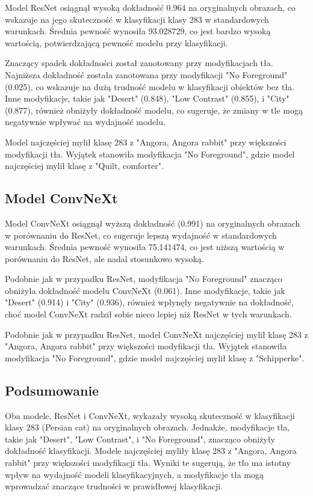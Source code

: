 Model ResNet osiągnął wysoką dokładność 0.964 na oryginalnych obrazach, co wskazuje na jego skuteczność w klasyfikacji klasy 283 w standardowych warunkach. Średnia pewność wynosiła 93.028729, co jest bardzo wysoką wartością, potwierdzającą pewność modelu przy klasyfikacji.

Znaczący spadek dokładności został zanotowany przy modyfikacjach tła. Najniższa dokładność została zanotowana przy modyfikacji "No Foreground" (0.025), co wskazuje na dużą trudność modelu w klasyfikacji obiektów bez tła. Inne modyfikacje, takie jak "Desert" (0.848), "Low Contrast" (0.855), i "City" (0.877), również obniżyły dokładność modelu, co sugeruje, że zmiany w tle mogą negatywnie wpływać na wydajność modelu.

Model najczęściej mylił klasę 283 z "Angora, Angora rabbit" przy większości modyfikacji tła. Wyjątek stanowiła modyfikacja "No Foreground", gdzie model najczęściej mylił klasę z "Quilt, comforter".

\subsection*{Model ConvNeXt}

Model ConvNeXt osiągnął wyższą dokładność (0.991) na oryginalnych obrazach w porównaniu do ResNet, co sugeruje lepszą wydajność w standardowych warunkach. Średnia pewność wynosiła 75.141474, co jest niższą wartością w porównaniu do ResNet, ale nadal stosunkowo wysoką.

Podobnie jak w przypadku ResNet, modyfikacja "No Foreground" znacząco obniżyła dokładność modelu ConvNeXt (0.061). Inne modyfikacje, takie jak "Desert" (0.914) i "City" (0.936), również wpłynęły negatywnie na dokładność, choć model ConvNeXt radził sobie nieco lepiej niż ResNet w tych warunkach.

Podobnie jak w przypadku ResNet, model ConvNeXt najczęściej mylił klasę 283 z "Angora, Angora rabbit" przy większości modyfikacji tła. Wyjątek stanowiła modyfikacja "No Foreground", gdzie model najczęściej mylił klasę z "Schipperke".

\subsection*{Podsumowanie}

Oba modele, ResNet i ConvNeXt, wykazały wysoką skuteczność w klasyfikacji klasy 283 (Persian cat) na oryginalnych obrazach. Jednakże, modyfikacje tła, takie jak "Desert", "Low Contrast", i "No Foreground", znacząco obniżyły dokładność klasyfikacji. Modele najczęściej myliły klasę 283 z "Angora, Angora rabbit" przy większości modyfikacji tła. Wyniki te sugerują, że tło ma istotny wpływ na wydajność modeli klasyfikacyjnych, a modyfikacje tła mogą wprowadzać znaczące trudności w prawidłowej klasyfikacji.

